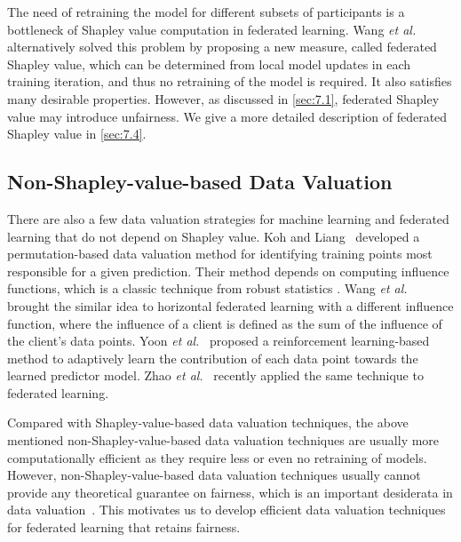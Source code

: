 The need of retraining the model for different subsets of participants is a bottleneck of Shapley value computation in federated learning. Wang \textit{et al.}~\cite{wang2020principled} alternatively solved this problem by proposing a new measure, called federated Shapley value, which can be determined from local model updates in each training iteration, and thus no retraining of the model is required. It also satisfies many desirable properties. However, as discussed in \autoref{sec:7.1}, federated Shapley value may introduce unfairness. We give a more detailed description of federated Shapley value in \autoref{sec:7.4}. 

\subsection{Non-Shapley-value-based Data Valuation}
There are also a few data valuation strategies for machine learning and federated learning that do not depend on Shapley value. Koh and Liang~\cite{koh2017understanding} developed a permutation-based data valuation method for identifying training points most responsible for a given prediction. Their method depends on computing influence functions, which is a classic technique from robust statistics \cite{hampel1974influence}. Wang \textit{et al.}~\cite{wang2019measure} brought the similar idea to horizontal federated learning with a different influence function, where the influence of a client is defined as the sum of the influence of the client's data points. Yoon \textit{et al.}~\cite{yoon2020data} proposed a reinforcement learning-based method to adaptively learn the contribution of each data point towards the learned predictor model. Zhao \textit{et al.}~\cite{zhao2021efficient} recently applied the same technique to federated learning. 

Compared with Shapley-value-based data valuation techniques, the above mentioned non-Shapley-value-based data valuation techniques are usually more computationally efficient as they require less or even no retraining of models. However, non-Shapley-value-based data valuation techniques usually cannot provide any theoretical guarantee on fairness, which is an important desiderata in data valuation~\cite{ghorbani2019data, pei2020survey}. This motivates us to develop efficient data valuation techniques for federated learning that retains fairness. 

